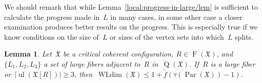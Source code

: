 \documentclass[english,a4paper]{article}
\theoremstyle{plain}
\newtheorem{lemma}      [theorem]{Lemma}
\theoremstyle{definition}
\DeclareMathOperator{\Fibers}{F}
\newcommand{\coherentConfig}{\ensuremath{\mathfrak{X}}}
\newcommand{\fibers}[1]{\ensuremath{\Fibers \left( #1 \right)}}
\newcommand{\inducedCC}[1]{\ensuremath{\coherentConfig[#1]}}
\DeclareMathOperator*{\ul}{ul}
\DeclareMathOperator*{\WLdim}{WLdim}
\newcommand{\wldim}[1]{\ensuremath{\WLdim\left(#1\right)}}
\DeclareMathOperator*{\Quotient}{Q}
\newcommand{\quotientGraph}[1]{\ensuremath{\Quotient(#1)}}
\newcommand{\f}{f}
\DeclareMathOperator{\parameters}{Par}
\begin{document}
We should remark that while Lemma~\ref{local:progress-in-large/lem} is sufficient to calculate the progress made in~$L$ in many cases, in some other case a closer examination produces better results on the progress.
This is especially true if we know conditions on the size of~$L$ or sizes of the vertex sets into which~$L$ splits.










\begin{lemma}
    \label{lem:local-argument:3-large-neighbors}
    Let~$\coherentConfig$ be a critical coherent configuration, $R \in \fibers{\coherentConfig}$, and~$\{L_1,L_2,L_3\}$ a set of large fibers adjacent to~$R$ in~$\quotientGraph{\coherentConfig}$.
    If~$R$ is a large fiber or~$|\ul(\inducedCC{R})| \geq 3$, then~$\wldim{\coherentConfig} \leq 1 + \widetilde{\f}( \tau(\parameters(\coherentConfig)) - 1)$.
\end{lemma}
\end{document}
